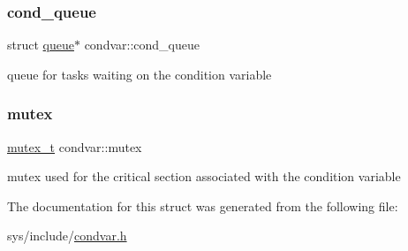 \subsubsection{\texorpdfstring{cond\+\_\+queue}{cond\_queue}}
{\footnotesize\ttfamily struct \hyperlink{structqueue}{queue}$\ast$ condvar\+::cond\+\_\+queue}

queue for tasks waiting on the condition variable \mbox{\label{structcondvar_a573f1b5d528d692d581b734913807b66}} 
\subsubsection{\texorpdfstring{mutex}{mutex}}
{\footnotesize\ttfamily \hyperlink{mutex_8h_af6ff4e9d708d58c0662f63a81713a926}{mutex\+\_\+t} condvar\+::mutex}

mutex used for the critical section associated with the condition variable 

The documentation for this struct was generated from the following file\+:\begin{DoxyCompactItemize}
\item 
sys/include/\hyperlink{condvar_8h}{condvar.\+h}\end{DoxyCompactItemize}
